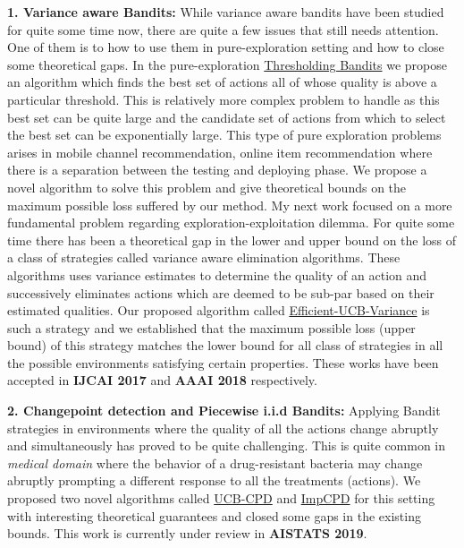 \documentclass[twoside]{article}
\begin{document}
\textbf{1. Variance aware Bandits:} While variance aware bandits have been studied for quite some time now, there are quite a few issues that still needs attention. One of them is to how to use them in pure-exploration setting and how to close some theoretical gaps. In the pure-exploration \href{https://www.ijcai.org/proceedings/2017/0350.pdf}{Thresholding Bandits} \citep{mukherjee2016} we propose an algorithm which finds the best set of actions all of whose quality is above a particular threshold. This is relatively more complex problem to handle as this best set can be quite large and the candidate set of actions from which to select the best set can be exponentially large. This type of pure exploration problems arises in mobile channel recommendation, online item recommendation where there is a separation between the testing and deploying phase. We propose a novel algorithm to solve this problem and give theoretical bounds on the maximum possible loss suffered by our method. My next work focused on a more fundamental problem regarding exploration-exploitation dilemma. For quite some time there has been a theoretical gap in the lower and upper bound on the loss of a class of strategies called variance aware elimination algorithms. These algorithms uses variance estimates to determine the quality of an action and successively eliminates actions which are deemed to be sub-par based on their estimated qualities. Our proposed algorithm called \href{https://www.aaai.org/ocs/index.php/AAAI/AAAI18/paper/view/16111}{Efficient-UCB-Variance} \citep{mukherjee2018} is such a strategy and we established that the maximum possible loss (upper bound) of this strategy matches the lower bound for all class of strategies in all the possible environments satisfying certain properties. These works have been accepted in \textbf{IJCAI 2017} and \textbf{AAAI 2018} respectively.

\textbf{2. Changepoint detection and Piecewise i.i.d Bandits:}  Applying Bandit strategies in environments where the quality of all the actions change abruptly and simultaneously has proved to be quite challenging. This is quite common in \textit{medical domain} where the behavior of a drug-resistant bacteria may change abruptly prompting a different response to all the treatments (actions). We proposed two novel algorithms called \href{https://subhojyoti.github.io/pdf/aistats_2019.pdf}{UCB-CPD} and \href{https://subhojyoti.github.io/pdf/aistats_2019.pdf}{ImpCPD} for this setting with interesting theoretical guarantees and closed some gaps in the existing bounds. This work is currently under review in \textbf{AISTATS 2019}. 
\end{document}
